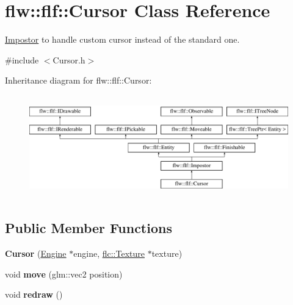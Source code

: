 \hypertarget{classflw_1_1flf_1_1Cursor}{}\section{flw\+:\+:flf\+:\+:Cursor Class Reference}
\label{classflw_1_1flf_1_1Cursor}


\hyperlink{classflw_1_1flf_1_1Impostor}{Impostor} to handle custom cursor instead of the standard one.  




{\ttfamily \#include $<$Cursor.\+h$>$}

Inheritance diagram for flw\+:\+:flf\+:\+:Cursor\+:\begin{figure}[H]
\begin{center}
\leavevmode
\includegraphics[height=4.487180cm]{classflw_1_1flf_1_1Cursor}
\end{center}
\end{figure}
\subsection*{Public Member Functions}
\begin{DoxyCompactItemize}
\item 
{\bfseries Cursor} (\hyperlink{classflw_1_1Engine}{Engine} $\ast$engine, \hyperlink{classflw_1_1flc_1_1Texture}{flc\+::\+Texture} $\ast$texture)\hypertarget{classflw_1_1flf_1_1Cursor_a339bd00cbcad4d867222ffedbbdce45e}{}\label{classflw_1_1flf_1_1Cursor_a339bd00cbcad4d867222ffedbbdce45e}

\item 
void {\bfseries move} (glm\+::vec2 position)\hypertarget{classflw_1_1flf_1_1Cursor_a444c7f22a58b7a0271e7a891d7472ff6}{}\label{classflw_1_1flf_1_1Cursor_a444c7f22a58b7a0271e7a891d7472ff6}

\item 
void {\bfseries redraw} ()\hypertarget{classflw_1_1flf_1_1Cursor_a667a8922c7b91e186f7531eaef7be551}{}\label{classflw_1_1flf_1_1Cursor_a667a8922c7b91e186f7531eaef7be551}

\end{DoxyCompactItemize}
